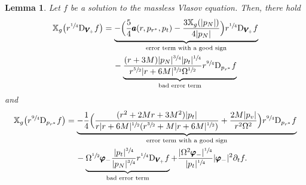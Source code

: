\documentclass[10pt]{amsart}
\theoremstyle{plain}
\newtheorem{lemma}[proposition]{Lemma}
\theoremstyle{definition}
\newcommand\T{{\mathbb{X}}}
\begin{document}
\begin{lemma}\label{Propartialprstarbisbis}
Let $f$ be a solution to the massless Vlasov equation. Then, there hold
\begin{align*}
\T_g \bigl(r^{\sfrac{1}{4}}\mathrm{D}_{\pmb{V}_{\!+}} f \bigr) & =\underbrace{-\Bigl(\frac{5}{4}\pmb{a}(r,p_{r^*},p_t)-\frac{3\T_g(|p_N|)}{4|p_N|} \Bigr) r^{\sfrac{1}{4}}\mathrm{D}_{\pmb{V}_{\!+}}f}_{\text{error term with a good sign}} \\
& \quad \, - \underbrace{\frac{(r+3M)|p_N|^{\sfrac{3}{4}}|p_t|^{\sfrac{1}{4}}}{r^{\sfrac{5}{2}}|r+6M|^{\sfrac{3}{2}} \Omega^{\sfrac{1}{2}}} r^{\sfrac{9}{4}} \mathrm{D}_{p_{r^*}}f}_{\text{bad error term}} \end{align*}
and
\begin{align*}
\T_g \bigl(r^{\sfrac{9}{4}}\mathrm{D}_{p_{r^*}} f \bigr)& = \underbrace{-\frac{1}{4}\Bigl(\frac{(r^2+2Mr+3M^2)|p_t|}{r|r+6M|^{\sfrac{1}{2}}(r^{\sfrac{3}{2}}+M|r+6M|^{\sfrac{1}{2}}) }+\frac{2M|p_v|}{r^2 \Omega^2} \Bigr) r^{\sfrac{9}{4}}\mathrm{D}_{p_{r^*}} f}_{\text{error term with a good sign}} \\
& \quad \, -\underbrace{\Omega^{\sfrac{1}{2}}\pmb{\varphi}_-\frac{|p_t|^{\sfrac{3}{4}}}{|p_N|^{\sfrac{3}{4}}} r^{\sfrac{1}{4}}\mathrm{D}_{\pmb{V}_{\!+}} f}_{\text{bad error term}} +\frac{ |\Omega^2\pmb{\varphi}_-|^{\sfrac{1}{4}}}{ |p_t|^{\sfrac{1}{4}}} |\pmb{\varphi}_-|^2 \partial_tf.
\end{align*}
\end{lemma}
\end{document}
